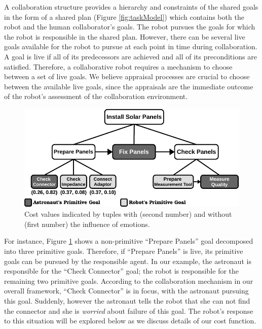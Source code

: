 \documentclass[12pt]{report}
\begin{document}
A collaboration structure provides a hierarchy and constraints of the shared
goals in the form of a shared plan (Figure \ref{fig:taskModel}) which contains
both the robot and the human collaborator's goals. The robot pursues the goals
for which the robot is responsible in the shared plan. However, there can be
several live goals available for the robot to pursue at each point in time
during collaboration. A goal is live if all of its predecessors are achieved and
all of its preconditions are satisfied. Therefore, a collaborative robot
requires a mechanism to choose between a set of live goals. We believe appraisal
processes are crucial to choose between the available live goals, since the
appraisals are the immediate outcome of the robot's assessment of the
collaboration environment.

\begin{figure}[tbh]
  \centering
  \includegraphics[width=1\textwidth]{figure/goal_management_collaboration_structure-croped.pdf}
  \caption{Cost values indicated by tuples with (second number) and without
  (first number) the influence of emotions.}
  \label{fig:task-model-astronaut}
\end{figure}

For instance, Figure \ref{fig:task-model-astronaut} shows a non-primitive
``Prepare Panels'' goal decomposed into three primitive goals. Therefore, if
``Prepare Panels'' is live, its primitive goals can be pursued by the
responsible agent. In our example, the astronaut is responsible for the ``Check
Connector'' goal; the robot is responsible for the remaining two primitive
goals. According to the collaboration mechanism in our overall framework,
``Check Connector'' is in focus, with the astronaut pursuing this goal.
Suddenly, however the astronaut tells the robot that she can not find the
connector and she is \textit{worried} about failure of this goal. The robot's
response to this situation will be explored below as we discuss details of our
cost function.
\end{document}

